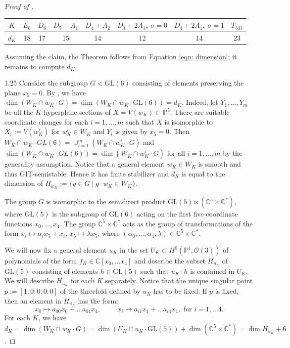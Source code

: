 \documentclass[12pt]{amsart}
\numberwithin{equation}{section}
\theoremstyle{plain}
\theoremstyle{remark}
\theoremstyle{definition}
\newcommand{\bP}{\mathbb{P}}
\newcommand{\bC}{\mathbb{C}}
\newcommand{\calO}{\mathcal{O}}
\newcommand{\GL}{\mathrm{GL}}
\begin{document}
\begin{proof}[Proof of ]
    \begin{table}[h!]
\centering
\begin{tabular}{c|c|c|c|c|c|c|c}

$K$ & $E_6$ & $D_6$ & $D_5+A_1$& $D_4+A_2$ & $D_4+2A_1$, $\sigma=0$ & $D_4+2A_1$, $\sigma=1$ & $T_{333}$ \\ \hline
$d_K$   & 18   & 17   &  15  & 14   & 12   & 14 & 23\\ 
\end{tabular}

\label{tab: dK counts}
\end{table}
    
   Assuming the claim, the Theorem follows from Equation \ref{eqn: dimension}; it remains to compute $d_K$.
    
    \medskip
    \begin{spacing}{1.25}
    Consider the subgroup $G<\GL(6)$ consisting of elements preserving the plane $x_5=0$. By , we have $\dim(W_K\cap w_K\cdot G)=\dim(W_K\cap w_K\cdot\GL(6))=d_K$.
    Indeed, let $Y_1,\ldots,Y_m$ be all the $K$-hyperplane sections of $X=V(w_K)\subset \bP^5$. There are suitable coordinate changes for each $i=1,\ldots,m$ such that $X$ is isomorphic to $X_i:=V(w_K^i)$ for $w_K^i\in W_K$ and $Y_i$ is given by $x_5=0$. Then  $W_K\cap w_K\cdot GL(6)=\cup_{i=1}^m(W_K\cap w_K^i\cdot G)$ and $\dim(W_K\cap w_K\cdot GL(6))=\dim(W_K\cap w_K^i\cdot G)$ for all $i=1,\ldots,m$ by the generality assumption.
    Notice that a general element $w_K\in W_K$ is smooth and thus GIT-semistable. Hence it has finite stabilizer and $d_K$ is equal to the dimension of $H_{w_K}:=\{g\in G \mid g\cdot w_K\in W_K\}$.
    \end{spacing}
    
    The group $G$ is isomorphic to the semidirect product $\GL(5)\ltimes(\bC^5\times \bC^*)$, where $\GL(5)$ is the subgroup of $\GL(6)$ acting on the first five coordinate functions $x_0,\ldots,x_4$. 
    The group $\bC^5\times \bC^*$ acts as the group of transformations of the form $x_i\mapsto \alpha_ix_5+x_i$, $x_5\mapsto \lambda x_5$, where $(\alpha_0,\ldots,\alpha_4,\lambda)\in \bC^5\times \bC^*$.
    
    We will now fix a general element $u_K$ in the set $U_K\subset H^0(\bP^4,\calO(3))$ of polynomials of the form $f_K\in \bC[x_0,\dots x_4]$ and describe the subset $H_{u_K}$ of $\GL(5)$ consisting of elements $h\in\GL(5)$ such that $u_K\cdot h$ is contained in $U_K$.  We will describe $H_{u_K}$ for each $K$ separately.  
    Notice that the unique singular point $p:=[1:0:0:0:0]$ of the threefold defined by $u_K$ has to be fixed. If $p$ is fixed, then an element in $H_{u_K}$ has the form: 
    $$x_0\mapsto a_{00}x_0+\ldots a_{04}x_4, \hspace{1cm} x_i\mapsto a_{i1}x_1+\ldots a_{i4}x_4, \text{ for } i=1,\dots 4.$$ For each $K$, we have $d_K=\dim(W_K\cap w_K\cdot G)=\dim(U_K\cap u_K\cdot\GL(5))+\dim(\bC^5\times \bC^*)=\dim H_{u_K}+6$.
    

\end{proof}
\end{document}
